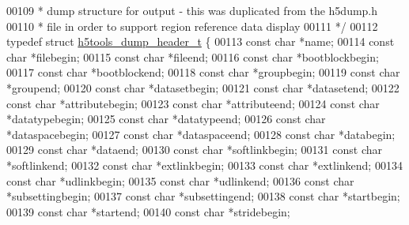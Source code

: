 \begin{DoxyCode}
{00109 \textcolor{comment}{ * dump structure for output - this was duplicated from the h5dump.h}
00110 \textcolor{comment}{ * file in order to support region reference data display}
00111 \textcolor{comment}{ */}
00112 \textcolor{keyword}{typedef} \textcolor{keyword}{struct }\hyperlink{structh5tools__dump__header__t}{h5tools\_dump\_header\_t} \{
00113     \textcolor{keyword}{const} \textcolor{keywordtype}{char} *name;
00114     \textcolor{keyword}{const} \textcolor{keywordtype}{char} *filebegin;
00115     \textcolor{keyword}{const} \textcolor{keywordtype}{char} *fileend;
00116     \textcolor{keyword}{const} \textcolor{keywordtype}{char} *bootblockbegin;
00117     \textcolor{keyword}{const} \textcolor{keywordtype}{char} *bootblockend;
00118     \textcolor{keyword}{const} \textcolor{keywordtype}{char} *groupbegin;
00119     \textcolor{keyword}{const} \textcolor{keywordtype}{char} *groupend;
00120     \textcolor{keyword}{const} \textcolor{keywordtype}{char} *datasetbegin;
00121     \textcolor{keyword}{const} \textcolor{keywordtype}{char} *datasetend;
00122     \textcolor{keyword}{const} \textcolor{keywordtype}{char} *attributebegin;
00123     \textcolor{keyword}{const} \textcolor{keywordtype}{char} *attributeend;
00124     \textcolor{keyword}{const} \textcolor{keywordtype}{char} *datatypebegin;
00125     \textcolor{keyword}{const} \textcolor{keywordtype}{char} *datatypeend;
00126     \textcolor{keyword}{const} \textcolor{keywordtype}{char} *dataspacebegin;
00127     \textcolor{keyword}{const} \textcolor{keywordtype}{char} *dataspaceend;
00128     \textcolor{keyword}{const} \textcolor{keywordtype}{char} *databegin;
00129     \textcolor{keyword}{const} \textcolor{keywordtype}{char} *dataend;
00130     \textcolor{keyword}{const} \textcolor{keywordtype}{char} *softlinkbegin;
00131     \textcolor{keyword}{const} \textcolor{keywordtype}{char} *softlinkend;
00132     \textcolor{keyword}{const} \textcolor{keywordtype}{char} *extlinkbegin;
00133     \textcolor{keyword}{const} \textcolor{keywordtype}{char} *extlinkend;
00134     \textcolor{keyword}{const} \textcolor{keywordtype}{char} *udlinkbegin;
00135     \textcolor{keyword}{const} \textcolor{keywordtype}{char} *udlinkend;
00136     \textcolor{keyword}{const} \textcolor{keywordtype}{char} *subsettingbegin;
00137     \textcolor{keyword}{const} \textcolor{keywordtype}{char} *subsettingend;
00138     \textcolor{keyword}{const} \textcolor{keywordtype}{char} *startbegin;
00139     \textcolor{keyword}{const} \textcolor{keywordtype}{char} *startend;
00140     \textcolor{keyword}{const} \textcolor{keywordtype}{char} *stridebegin;
}
\end{DoxyCode}
